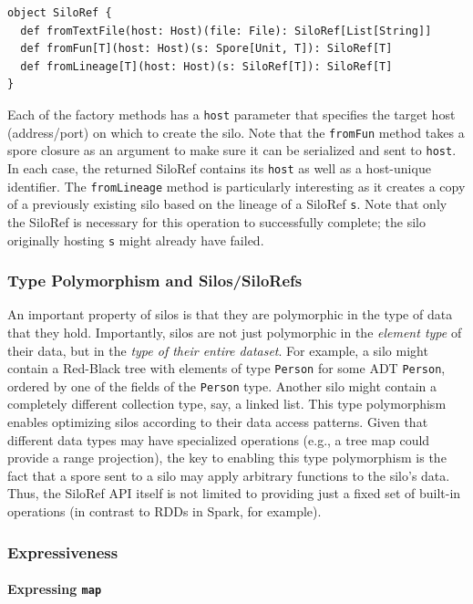 \documentclass[10pt]{sigplanconf}
\theoremstyle{definition}
\theoremstyle{definition}
\begin{document}
\begin{lstlisting}
object SiloRef {
  def fromTextFile(host: Host)(file: File): SiloRef[List[String]]
  def fromFun[T](host: Host)(s: Spore[Unit, T]): SiloRef[T]
  def fromLineage[T](host: Host)(s: SiloRef[T]): SiloRef[T]
}
\end{lstlisting}
\noindent
Each of the factory methods has a \verb|host| parameter that specifies the
target host (address/port) on which to create the silo. Note that the
\verb|fromFun| method takes a spore closure as an argument to make sure it can
be serialized and sent to \verb|host|. In each case, the returned SiloRef
contains its \verb|host| as well as a host-unique identifier. The
\verb|fromLineage| method is particularly interesting as it creates a copy of a
previously existing silo based on the lineage of a SiloRef \verb|s|. Note that
only the SiloRef is necessary for this operation to successfully complete; the
silo originally hosting \verb|s| might already have failed.

\subsubsection{Type Polymorphism and Silos/SiloRefs}

An important property of silos is that they are polymorphic in the type of data
that they hold. Importantly, silos are not just polymorphic in the {\em element
type} of their data, but in the {\em type of their entire dataset}. For example,
a silo might contain a Red-Black tree with elements of type \verb|Person| for
some ADT \verb|Person|, ordered by one of the fields of the \verb|Person| type.
Another silo might contain a completely different collection type, say, a linked
list. This type polymorphism enables optimizing silos according to their data
access patterns. Given that different data types may have specialized operations
(e.g., a tree map could provide a range projection), the key to enabling this
type polymorphism is the fact that a spore sent to a silo may apply arbitrary
functions to the silo's data. Thus, the SiloRef API itself is not limited to
providing just a fixed set of built-in operations (in contrast to RDDs in Spark,
for example).

\subsubsection{Expressiveness}
\label{sec:expr}

\paragraph{Expressing \texttt{map}}
\end{document}
